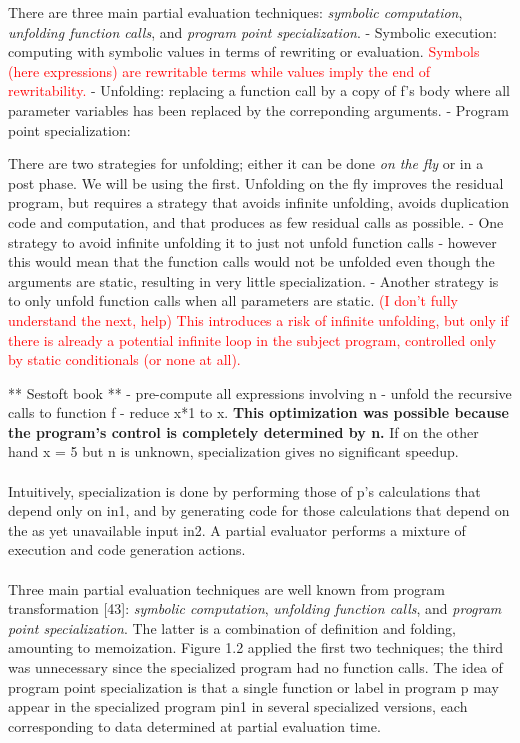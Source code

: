 There are three main partial evaluation techniques: \textit{symbolic computation}, \textit{unfolding function calls}, and \textit{program point specialization}.
- Symbolic execution: computing with symbolic values in terms of rewriting or evaluation. \textcolor{red}{Symbols (here expressions) are rewritable terms while values imply the end of rewritability.}
- Unfolding: replacing a function call by a copy of f's body where all parameter variables has been replaced by the correponding arguments.
- Program point specialization: 

There are two strategies for unfolding; either it can be done \textit{on the fly} or in a post phase. We will be using the first. Unfolding on the fly improves the residual program, but requires a strategy that avoids infinite unfolding, avoids duplication code and computation, and that produces as few residual calls as possible. 
- One strategy to avoid infinite unfolding it to just not unfold function calls - however this would mean that the function calls would not be unfolded even though the arguments are static, resulting in very little specialization. 
- Another strategy is to only unfold function calls when all parameters are static. \textcolor{red}{(I don't fully understand the next, help) This introduces a risk of infinite unfolding, but only if there is already a potential infinite loop in the subject program, controlled only by static conditionals (or none at all).} 

** Sestoft book ** 
- pre-compute all expressions involving n
- unfold the recursive calls to function f
- reduce x*1 to x. \textbf{This optimization was possible because the program's control is completely determined by n.} If on the other hand x = 5 but n is unknown, specialization gives no significant speedup.
\\\\
Intuitively, specialization is done by performing those of p's calculations that depend only on in1, and by generating code for those calculations that depend on the as yet unavailable input in2. A partial evaluator performs a mixture of execution and code generation actions. 
\\\\
Three main partial evaluation techniques are well known from program transformation
[43]: \textit{symbolic computation}, \textit{unfolding function calls}, and \textit{program point specialization}. The latter is a combination of definition and folding, amounting to memoization. Figure 1.2 applied the first two techniques; the third was unnecessary since the specialized program had no function calls. The idea of program point specialization is that a single function or label in program p may appear in the specialized program pin1 in several specialized versions, each corresponding to data determined at partial evaluation time.\\

